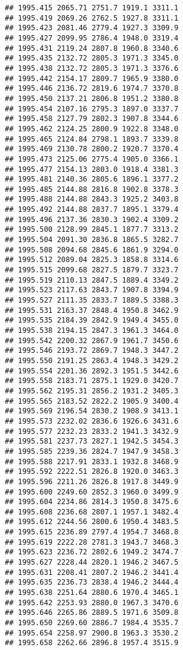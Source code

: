 \documentclass[
]{article}
\begin{document}
\begin{verbatim}
## 1995.415 2065.71 2751.7 1919.1 3311.1
## 1995.419 2069.26 2762.5 1927.8 3311.1
## 1995.423 2081.46 2779.4 1927.3 3309.9
## 1995.427 2099.95 2786.4 1948.0 3319.4
## 1995.431 2119.24 2807.8 1960.8 3340.6
## 1995.435 2132.72 2805.3 1971.3 3345.0
## 1995.438 2132.72 2805.3 1971.3 3376.6
## 1995.442 2154.17 2809.7 1965.9 3380.0
## 1995.446 2136.72 2819.6 1974.7 3370.8
## 1995.450 2137.21 2806.8 1951.2 3380.8
## 1995.454 2107.16 2795.3 1897.0 3337.7
## 1995.458 2127.79 2802.3 1907.8 3344.6
## 1995.462 2124.25 2800.9 1922.8 3348.0
## 1995.465 2124.84 2798.1 1893.7 3339.8
## 1995.469 2130.78 2800.2 1920.7 3370.4
## 1995.473 2125.06 2775.4 1905.0 3366.1
## 1995.477 2154.13 2803.0 1918.4 3381.3
## 1995.481 2140.36 2805.6 1896.1 3377.2
## 1995.485 2144.88 2816.8 1902.8 3378.3
## 1995.488 2144.88 2843.3 1925.2 3403.8
## 1995.492 2144.88 2837.7 1895.1 3379.4
## 1995.496 2137.36 2830.3 1902.4 3309.2
## 1995.500 2128.99 2845.1 1877.7 3313.2
## 1995.504 2091.30 2836.8 1865.5 3282.7
## 1995.508 2094.68 2845.6 1861.9 3294.0
## 1995.512 2089.04 2825.3 1858.8 3314.6
## 1995.515 2099.68 2827.5 1879.7 3323.7
## 1995.519 2110.13 2847.5 1889.4 3349.2
## 1995.523 2117.63 2843.7 1907.8 3394.9
## 1995.527 2111.35 2833.7 1889.5 3388.3
## 1995.531 2163.37 2848.4 1950.8 3462.9
## 1995.535 2184.39 2842.9 1949.4 3455.0
## 1995.538 2194.15 2847.3 1961.3 3464.0
## 1995.542 2200.32 2867.9 1961.7 3450.6
## 1995.546 2193.72 2869.7 1948.3 3447.2
## 1995.550 2191.25 2863.4 1948.3 3429.2
## 1995.554 2201.36 2892.3 1951.5 3442.6
## 1995.558 2183.71 2875.1 1929.0 3420.7
## 1995.562 2195.31 2856.2 1931.2 3405.3
## 1995.565 2183.52 2822.2 1905.9 3400.4
## 1995.569 2196.54 2830.2 1908.9 3413.1
## 1995.573 2232.02 2836.6 1926.6 3431.6
## 1995.577 2232.23 2833.2 1941.3 3432.9
## 1995.581 2237.73 2827.1 1942.5 3454.3
## 1995.585 2239.36 2824.7 1947.9 3458.3
## 1995.588 2217.91 2833.1 1932.8 3468.9
## 1995.592 2222.51 2826.8 1920.0 3463.3
## 1995.596 2211.26 2826.8 1917.8 3449.9
## 1995.600 2249.60 2852.3 1960.0 3499.9
## 1995.604 2234.86 2814.3 1950.8 3475.6
## 1995.608 2236.68 2807.1 1957.1 3482.4
## 1995.612 2244.56 2800.6 1950.4 3483.5
## 1995.615 2236.89 2797.4 1954.7 3468.8
## 1995.619 2222.28 2781.3 1943.7 3468.3
## 1995.623 2236.72 2802.6 1949.2 3474.7
## 1995.627 2228.44 2820.1 1946.2 3467.5
## 1995.631 2208.41 2807.2 1946.2 3441.4
## 1995.635 2236.73 2838.4 1946.2 3444.4
## 1995.638 2251.64 2880.6 1970.4 3465.1
## 1995.642 2253.93 2880.0 1967.3 3470.6
## 1995.646 2265.86 2889.5 1971.6 3509.8
## 1995.650 2269.60 2886.7 1984.4 3535.7
## 1995.654 2258.97 2900.8 1963.3 3530.2
## 1995.658 2262.66 2896.8 1957.4 3515.9

\end{verbatim}
\end{document}
